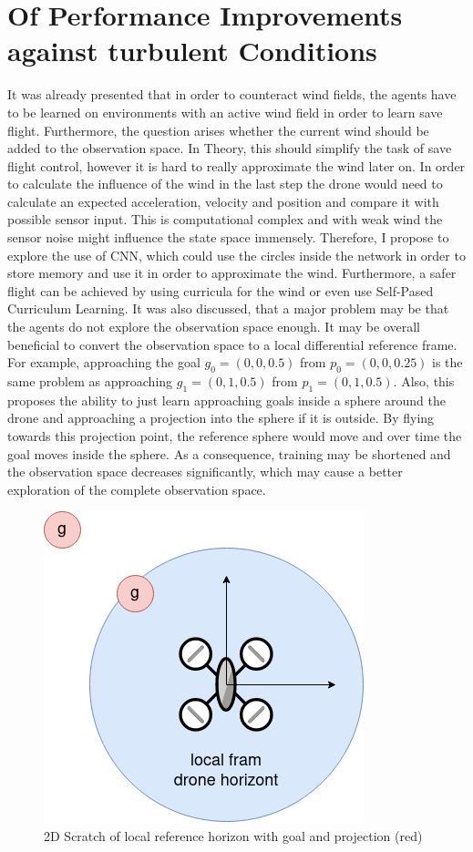 \section{Of Performance Improvements against turbulent Conditions}
It was already presented that in order to counteract wind fields, the agents have to be learned
on environments with an active wind field in order to learn save flight.
Furthermore, the question arises whether the current wind should be added to the observation space.
In Theory, this should simplify the task of save flight control, however it is hard 
to really approximate the wind later on. In order to calculate the influence 
of the wind in the last step the drone would need to calculate an expected acceleration, velocity and position 
and compare it with possible sensor input. This is computational complex and
with weak wind the sensor noise might influence the state space immensely.
Therefore, I propose to explore the use of CNN, which could use the circles inside the network in order 
to store memory and use it in order to approximate the wind.
Furthermore, a safer flight can be achieved by using curricula for the wind or even use 
Self-Pased Curriculum Learning.
It was also discussed, that a major problem may be that the agents do not explore the 
observation space enough.
It may be overall beneficial to convert the observation space to a local differential reference frame.
For example, approaching the goal $g_0 = (0, 0, 0.5)$ from $p_0 = (0, 0, 0.25)$ 
is the same problem as approaching $g_1 = (0,1, 0.5)$ from $p_1 = (0, 1, 0.5)$.
Also, this proposes the ability to just learn approaching goals inside a sphere around the drone 
and approaching a projection into the sphere if it is outside. By flying towards 
this projection point, the reference sphere would move and over time the goal moves inside the sphere.
As a consequence, training may be shortened and the observation space decreases significantly, which 
may cause a better exploration of the complete observation space.

\begin{figure}
    \centering
    \includegraphics[width=0.55\linewidth]{figures/localframe.png}
    \caption{2D Scratch of local reference horizon with goal and projection (red)}
\end{figure}

